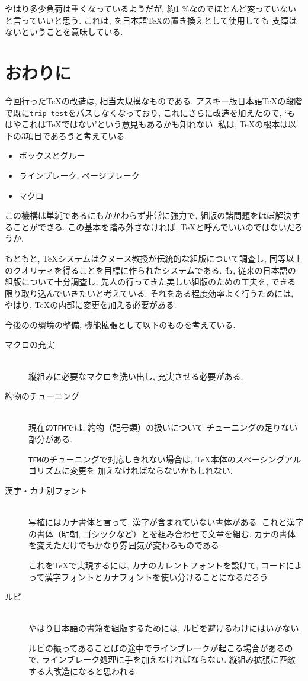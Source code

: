 やはり多少負荷は重くなっているようだが,
約1 \%なのでほとんど変っていないと言っていいと思う.
これは, \pTeX を日本語\TeX の置き換えとして使用しても
支障はないということを意味している.


\section{おわりに}

今回行った\TeX の改造は, 相当大規摸なものである.
アスキー版日本語\TeX の段階で既に{\tt trip test}をパスしなくなっており,
これにさらに改造を加えたので,
`もはやこれは\TeX ではない'という意見もあるかも知れない.
私は, \TeX の根本は以下の3項目であろうと考えている.
\begin{itemize}
\item ボックスとグルー
\item ラインブレーク, ページブレーク
\item マクロ
\end{itemize}
この機構は単純であるにもかかわらず非常に強力で,
組版の諸問題をほぼ解決することができる.
この基本を踏み外さなければ, \TeX と呼んでいいのではないだろうか.

もともと, \TeX システムはクヌース教授が伝統的な組版について調査し,
同等以上のクオリティを得ることを目標に作られたシステムである.
\pTeX も, 従来の日本語の組版について十分調査し,
先人の行ってきた美しい組版のための工夫を,
できる限り取り込んでいきたいと考えている.
それをある程度効率よく行うためには,
やはり, \TeX の内部に変更を加える必要がある.

今後の\pTeX の環境の整備, 機能拡張として以下のものを考えている.
\begin{description}
\item[マクロの充実]\ \\
	縦組みに必要なマクロを洗い出し, 充実させる必要がある.

\item[約物のチューニング]\ \\
	現在の{\tt TFM}では, 約物（記号類）の扱いについて
	チューニングの足りない部分がある.

	{\tt TFM}のチューニングで対応しきれない場合は,
	\TeX 本体のスペーシングアルゴリズムに変更を
	加えなければならないかもしれない.

\item[漢字・カナ別フォント]\ \\
	写植にはカナ書体と言って, 漢字が含まれていない書体がある.
	これと漢字の書体（明朝, ゴシックなど）とを組み合わせて文章を組む.
	カナの書体を変えただけでもかなり雰囲気が変わるものである.

	これを\TeX で実現するには, カナのカレントフォントを設けて,
	コードによって漢字フォントとカナフォントを使い分けることになるだろう.

\item[ルビ]\ \\
	やはり日本語の書籍を組版するためには, ルビを避けるわけにはいかない.

	ルビの振ってあることばの途中でラインブレークが起こる場合があるので,
	ラインブレーク処理に手を加えなければならない.
	縦組み拡張に匹敵する大改造になると思われる.
\end{description}


